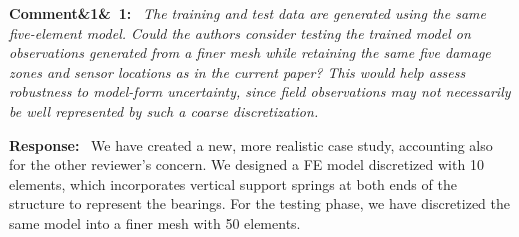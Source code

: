 \documentclass[11pt]{article}
\newenvironment{rcomment}[1]{\par\bigskip\noindent\textbf{Comment\ifx&#1&\else\ #1\fi:}\ \itshape}{\par}
\newenvironment{response}{\par\smallskip\noindent\color{resp}\textbf{Response:}\ }{\par}
\begin{document}
\begin{rcomment}{1}
The training and test data are generated using the same five-element model. Could the authors consider testing the trained model on observations generated from a finer mesh while retaining the same five damage zones and sensor locations as in the current paper? This would help assess robustness to model-form uncertainty, since field observations
may not necessarily be well represented by such a coarse discretization.
\end{rcomment}

\begin{response}
We have created a new, more realistic case study, accounting also for the other reviewer's concern. 
We designed a FE model discretized with 10 elements, which incorporates vertical support springs at both ends of the structure to represent the bearings.  
For the testing phase, we have discretized the same model into a finer mesh with 50 elements.


\end{response}
\end{document}
